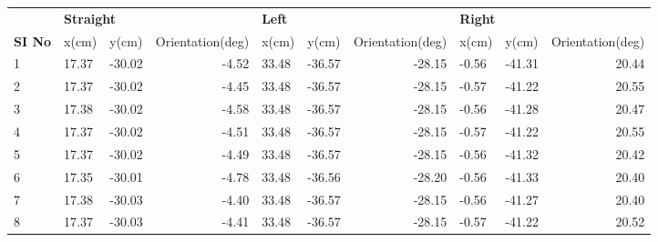
\begin{table}[] \footnotesize
\centering
\begin{tabular}{|l|l|l|r|l|l|r|l|l|r|}
\hline
                                & \multicolumn{3}{l|}{\textbf{Straight}} & \multicolumn{3}{l|}{\textbf{Left}} & \multicolumn{3}{l|}{\textbf{Right}} \\ \cline{2-10} 
\multirow{-2}{*}{\textbf{SI No}} & x(cm)           & y(cm)            & Orientation(deg)          & x(cm)  & y(cm)  & Orientation(deg) & x(cm)  & y(cm)   & Orientation(deg) \\ \hline
1                                                        & 17.37           & -30.02           & -4.52                     & 33.48  & -36.57 & -28.15           & -0.56  & -41.31  & 20.44            \\ \hline
2                                                        & 17.37           & -30.02           & -4.45                     & 33.48  & -36.57 & -28.15           & -0.57  & -41.22  & 20.55            \\ \hline
3                                                        & 17.38           & -30.02           & -4.58                     & 33.48  & -36.57 & -28.15           & -0.56  & -41.28  & 20.47            \\ \hline
4                                                        & 17.37           & -30.02           & -4.51                     & 33.48  & -36.57 & -28.15           & -0.57  & -41.22  & 20.55            \\ \hline
5                                                        & 17.37           & -30.02           & -4.49                     & 33.48  & -36.57 & -28.15           & -0.56  & -41.32  & 20.42            \\ \hline
6                                                        & 17.35           & -30.01           & -4.78                     & 33.48  & -36.56 & -28.20           & -0.56  & -41.33  & 20.40            \\ \hline
7                                                        & 17.38           & -30.03           & -4.40                     & 33.48  & -36.57 & -28.15           & -0.56  & -41.27  & 20.40            \\ \hline
8                                                        & 17.37           & -30.03           & -4.41                     & 33.48  & -36.57 & -28.15           & -0.57  & -41.22  & 20.52            \\ \hline

\end{tabular}
\end{table}

